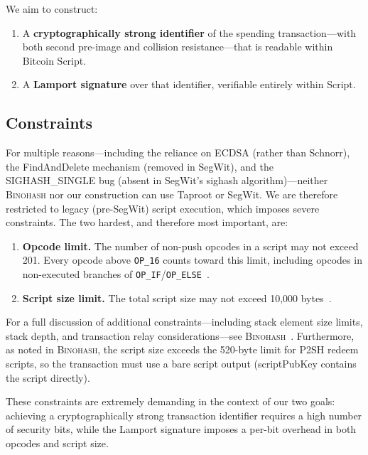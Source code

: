 \documentclass[11pt, a4paper]{article}
\begin{document}
We aim to construct:
\begin{enumerate}
    \item A \textbf{cryptographically strong identifier} of the spending transaction---with both second pre-image and collision resistance---that is readable within Bitcoin Script.
    \item A \textbf{Lamport signature} over that identifier, verifiable entirely within Script.
\end{enumerate}

\subsection{Constraints}
\label{sec:constraints}

For multiple reasons---including the reliance on ECDSA (rather than Schnorr), the FindAndDelete mechanism (removed in SegWit), and the SIGHASH\_SINGLE bug (absent in SegWit's sighash algorithm)---neither \textsc{Binohash} nor our construction can use Taproot or SegWit. We are therefore restricted to legacy (pre-SegWit) script execution, which imposes severe constraints. The two hardest, and therefore most important, are:

\begin{enumerate}
    \item \textbf{Opcode limit.} The number of non-push opcodes in a script may not exceed 201. Every opcode above \texttt{OP\_16} counts toward this limit, including opcodes in non-executed branches of \texttt{OP\_IF}/\texttt{OP\_ELSE}~\cite[Section~6]{linus2024binohash}.
    \item \textbf{Script size limit.} The total script size may not exceed 10,000 bytes~\cite[Section~6]{linus2024binohash}.
\end{enumerate}

\noindent For a full discussion of additional constraints---including stack element size limits, stack depth, and transaction relay considerations---see \textsc{Binohash}~\cite[Section~6]{linus2024binohash}. Furthermore, as noted in \textsc{Binohash}, the script size exceeds the 520-byte limit for P2SH redeem scripts, so the transaction must use a bare script output (scriptPubKey contains the script directly).

These constraints are extremely demanding in the context of our two goals: achieving a cryptographically strong transaction identifier requires a high number of security bits, while the Lamport signature imposes a per-bit overhead in both opcodes and script size.
\end{document}
